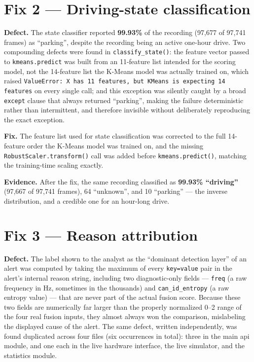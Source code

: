 \section{Fix 2 — Driving-state classification}
\label{sec:fix2}

\textbf{Defect.} The state classifier reported \textbf{99.93\%} of the recording (97{,}677 of 97{,}741 frames) as ``parking'', despite the recording being an active one-hour drive. Two compounding defects were found in \texttt{classify\_state()}: the feature vector passed to \texttt{kmeans.predict} was built from an 11-feature list intended for the scoring model, not the 14-feature list the K-Means model was actually trained on, which raised \texttt{ValueError: X has 11 features, but KMeans is expecting 14 features} on every single call; and this exception was silently caught by a broad \texttt{except} clause that always returned ``parking'', making the failure deterministic rather than intermittent, and therefore invisible without deliberately reproducing the exact exception.

\textbf{Fix.} The feature list used for state classification was corrected to the full 14-feature order the K-Means model was trained on, and the missing \texttt{RobustScaler.transform()} call was added before \texttt{kmeans.predict()}, matching the training-time scaling exactly.

\textbf{Evidence.} After the fix, the same recording classified as \textbf{99.93\% ``driving''} (97{,}667 of 97{,}741 frames), 64 ``unknown'', and 10 ``parking'' — the inverse distribution, and a credible one for an hour-long drive.

\section{Fix 3 — Reason attribution}

\textbf{Defect.} The label shown to the analyst as the ``dominant detection layer'' of an alert was computed by taking the maximum of every \texttt{key=value} pair in the alert's internal reason string, including two diagnostic-only fields — \texttt{freq} (a raw frequency in Hz, sometimes in the thousands) and \texttt{can\_id\_entropy} (a raw entropy value) — that are never part of the actual fusion score. Because these two fields are numerically far larger than the properly normalized 0--2 range of the four real fusion inputs, they almost always won the comparison, mislabeling the displayed cause of the alert. The same defect, written independently, was found duplicated across four files (six occurrences in total): three in the main \gls{api} module, and one each in the live hardware interface, the live simulator, and the statistics module.

